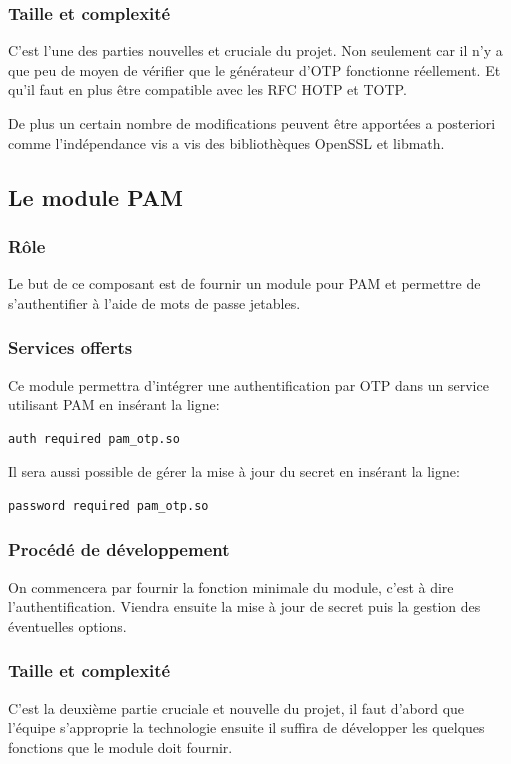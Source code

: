 \documentclass{"../../res/univ-projet"}
\begin{document}
\subsubsection{Taille et complexité}
C'est l'une des parties nouvelles et cruciale du projet. Non seulement car il n'y 
a que peu de moyen de vérifier que le générateur d'OTP fonctionne réellement. Et
qu'il faut en plus être compatible avec les RFC HOTP et TOTP.

De plus un certain nombre de modifications peuvent être apportées a posteriori comme 
l'indépendance vis a vis des bibliothèques OpenSSL et libmath.

\subsection{Le module PAM}
\subsubsection{Rôle}
Le but de ce composant est de fournir un module pour PAM et permettre de s'authentifier
à l'aide de mots de passe jetables.

\subsubsection{Services offerts}
Ce module permettra d'intégrer une authentification par OTP dans un service utilisant PAM
en insérant la ligne:
\begin{verbatim}
auth required pam_otp.so
\end{verbatim}
Il sera aussi possible de gérer la mise à jour du secret en insérant la ligne:
\begin{verbatim}
password required pam_otp.so
\end{verbatim}


\subsubsection{Procédé de développement}
On commencera par fournir la fonction minimale du module, c'est à dire l'authentification. Viendra
ensuite la mise à jour de secret puis la gestion des éventuelles options.

\subsubsection{Taille et complexité}
C'est la deuxième partie cruciale et nouvelle du projet, il faut d'abord que l'équipe s'approprie
la technologie ensuite il suffira de développer les quelques fonctions que le module doit fournir.
\end{document}
